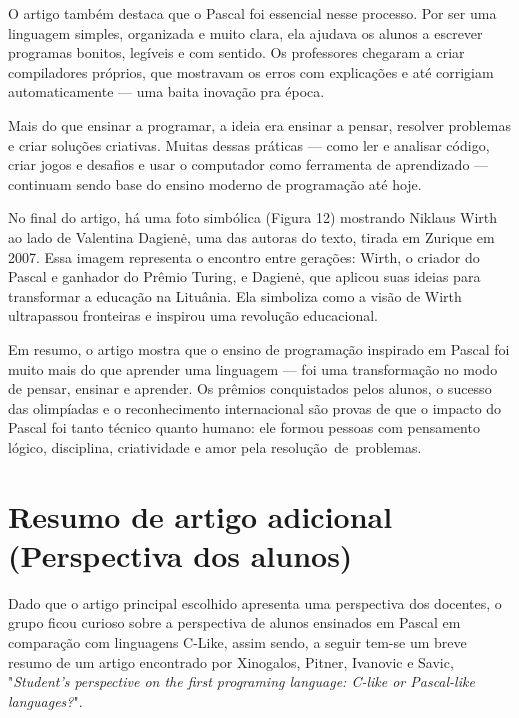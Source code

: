 \documentclass[12pt,a4paper,oneside]{abntex2}
\begin{document}
O artigo também destaca que o Pascal foi essencial nesse processo. Por ser uma linguagem simples, organizada e muito clara, ela ajudava os alunos a escrever programas bonitos, legíveis e com sentido.
Os professores chegaram a criar compiladores próprios, que mostravam os erros com explicações e até corrigiam automaticamente — uma baita inovação pra época.

Mais do que ensinar a programar, a ideia era ensinar a pensar, resolver problemas e criar soluções criativas.
Muitas dessas práticas — como ler e analisar código, criar jogos e desafios e usar o computador como ferramenta de aprendizado — continuam sendo base do ensino moderno de programação até hoje.

No final do artigo, há uma foto simbólica (Figura 12) mostrando Niklaus Wirth ao lado de Valentina Dagienė, uma das autoras do texto, tirada em Zurique em 2007.
Essa imagem representa o encontro entre gerações: Wirth, o criador do Pascal e ganhador do Prêmio Turing, e Dagienė, que aplicou suas ideias para transformar a educação na Lituânia.
Ela simboliza como a visão de Wirth ultrapassou fronteiras e inspirou uma revolução educacional.

Em resumo, o artigo mostra que o ensino de programação inspirado em Pascal foi muito mais do que aprender uma linguagem — foi uma transformação no modo de pensar, ensinar e aprender.
Os prêmios conquistados pelos alunos, o sucesso das olimpíadas e o reconhecimento internacional são provas de que o impacto do Pascal foi tanto técnico quanto humano: ele formou pessoas com pensamento lógico, disciplina, criatividade e amor pela resolução de problemas.
\chapter{Resumo de artigo adicional (Perspectiva dos alunos)}

Dado que o artigo principal escolhido apresenta uma perspectiva dos docentes, o grupo ficou curioso sobre a perspectiva de alunos ensinados em Pascal em comparação com linguagens C-Like, assim sendo, a seguir tem-se um breve resumo de um artigo encontrado por Xinogalos, Pitner, Ivanovic e Savic, "\textit{Student's perspective on the first programing language: C-like or Pascal-like languages?}".
\end{document}
